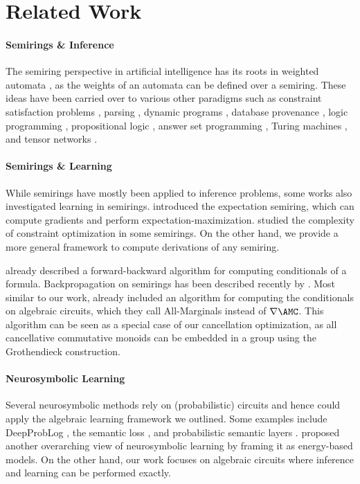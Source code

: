 \section{Related Work}
\label{sec:related_work}

\paragraph{Semirings \& Inference} The semiring perspective in artificial intelligence has its roots in weighted automata \cite{schutzenberger_definition_1961}, as the weights of an automata can be defined over a semiring. These ideas have been carried over to various other paradigms such as constraint satisfaction problems \cite{bistarelli_semiring-based_1997}, parsing \cite{goodman_semiring_1999}, dynamic programs \cite{eisner_compiling_2005}, database provenance \cite{green_provenance_2007}, logic programming \cite{kimmig_algebraic_2011}, propositional logic \cite{kimmig_algebraic_2017}, answer set programming \cite{eiter_weighted_2020}, Turing machines \cite{eiter_semiring_2023}, and tensor networks \cite{goral_model_2024}.

\paragraph{Semirings \& Learning} While semirings have mostly been applied to inference problems, some works also investigated learning in semirings. \citet{li_first-_2009} introduced the expectation semiring, which can compute gradients and perform expectation-maximization. \citet{pavan_constraint_2023} studied the complexity of constraint optimization in some semirings. On the other hand, we provide a more general framework to compute derivations of any semiring.

%
\citet{darwiche_tractable_2001} already described a forward-backward algorithm for computing conditionals of a formula. Backpropagation on semirings has been described recently by \cite{du_generalizing_2023}. Most similar to our work, \citet{shih_smoothing_2019} already included an algorithm for computing the conditionals on algebraic circuits, which they call All-Marginals instead of $\nabla \AMC$. This algorithm can be seen as a special case of our cancellation optimization, as all cancellative commutative monoids can be embedded in a group using the Grothendieck construction. %


\paragraph{Neurosymbolic Learning} Several neurosymbolic methods rely on (probabilistic) circuits and hence could apply the algebraic learning framework we outlined. Some examples include DeepProbLog \cite{manhaeve_deepproblog_2018}, the semantic loss \cite{xu_semantic_2018}, and probabilistic semantic layers \cite{ahmed_semantic_2022}. \citet{dickens_modeling_2024} proposed another overarching view of neurosymbolic learning by framing it as energy-based models. On the other hand, our work focuses on algebraic circuits where inference and learning can be performed exactly.
